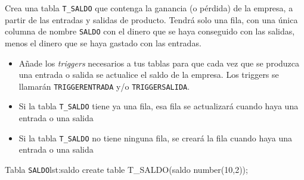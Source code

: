 \newpage

\begin{homeworkProblem}

  Crea una tabla \texttt{T\_SALDO} que contenga la ganancia (o pérdida) de la empresa, a partir de las entradas y salidas de producto. Tendrá solo una fila, con una única columna de nombre \texttt{SALDO} con el dinero que se haya conseguido con las salidas, menos el dinero que se haya gastado con las entradas.
  
  \begin{itemize}
  \item Añade los \textit{triggers} necesarios a tus tablas para que cada vez que se produzca una entrada o salida se actualice el saldo de la empresa. Los triggers se llamarán \texttt{TRIGGERENTRADA} y/o \texttt{TRIGGERSALIDA}.
  \item Si la tabla \texttt{T\_SALDO} tiene ya una fila, esa fila se actualizará cuando haya una entrada o una salida
  \item Si la tabla \texttt{T\_SALDO} no tiene ninguna fila, se creará la fila cuando haya una entrada o una salida
  \end{itemize}

  
\begin{listadosql}{Tabla \texttt{SALDO}}{lst:saldo}
create table T_SALDO(saldo number(10,2));
\end{listadosql}

\end{homeworkProblem}


